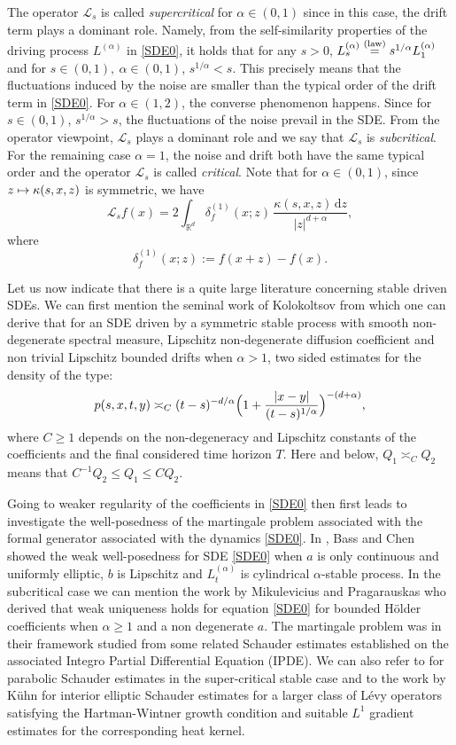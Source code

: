 \documentclass[JEP,XML,SOM,Unicode,published]{cedram}
\def\mto{\mathchoice{\longmapsto}{\mapsto}{\mapsto}{\mapsto}}
\theoremstyle{plain}
\theoremstyle{definition}
\newcommand\cL{{\mathcal L}}
\newcommand\mR{\mathbb{R}}
\newcommand\1{{\mathbf{1}}}
\newcommand\sL{{\mathscr L}}
\newcommand{\dif}{\,\mathrm{d}}
\begin{document}
The operator $\sL_{s}$ is called \textit{supercritical} for $\alpha\in(0,1)$ since in this case, the drift term plays a dominant role. Namely, from the self-similarity properties of the driving process $L^{(\alpha)}$ in \eqref{SDE0}, it holds that for any $s>0$, $L_s^{(\alpha)} \overset{({\rm law})}{=} s^{1/\alpha}L_1^{(\alpha)} $ and for $s\in (0,1),\ \alpha\in (0,1)$, $s^{1/\alpha}< s $. This precisely means that the fluctuations induced by the noise are smaller than the typical order of the drift term in \eqref{SDE0}.
For $\alpha\in(1,2)$, the converse phenomenon happens. Since for $s\in (0,1) $, $s^{1/\alpha}>s $, the fluctuations of the noise prevail in the SDE. From the operator viewpoint, $\cL_{s}$ plays a dominant role and we say that $\sL_{s}$ is \textit{subcritical}. For the remaining case $\alpha=1$, the noise and drift both have the same typical order and the operator $\sL_{s}$ is called \textit{critical}.
Note that for $\alpha\in(0,1)$, since $z\mto\kappa(s,x,z)$ is symmetric, we have
\[
\cL_{s} f(x)=2\int_{\mR^d}\delta^{(1)}_f(x;z)\,\frac{\kappa(s,x,z)\dif z}{|z|^{d+\alpha}},
\]
where
\[
\delta^{(1)}_f(x;z):=f(x+z)-f(x).
\]

Let us now indicate that there is a quite large literature concerning stable driven SDEs. We can first mention the seminal work of Kolokoltsov \cite{kolo:00} {from which one can derive} that for an SDE driven by a symmetric stable process with smooth non-degenerate spectral measure, Lipschitz non-degenerate diffusion coefficient and non trivial Lipschitz bounded drifts when $\alpha>1 $, two sided estimates for the density of the type:
\begin{equation}\label{FIRST_TW}
p(s,x,t,y)\asymp_C (t-s)^{-d/\alpha} \Bigl(1+\frac{|x-y|}{(t-s)^{1/\alpha}}\Bigr)^{-(d+\alpha)},
\end{equation}
where $C\ge 1$ depends on the non-degeneracy and Lipschitz constants of the coefficients and the final considered time horizon $T$.
Here and below, $Q_1\asymp_C Q_2$ means that $C^{-1}Q_2\leq Q_1\leq C Q_2$.

Going to weaker regularity of the coefficients in \eqref{SDE0} then first leads to investigate the well-posedness of the martingale problem associated with the formal generator associated with the dynamics \eqref{SDE0}. In \cite{Ba-Ch},
Bass and Chen showed the weak well-posedness for SDE \eqref{SDE0} when $a$ is only continuous and uniformly elliptic,
$b$ is Lipschitz and $L^{(\alpha)}_t$ is cylindrical $\alpha$-stable process.
In the subcritical case we can mention the work by Mikulevicius and Pragarauskas \cite{miku:prag:14}
who derived that weak uniqueness holds for equation \eqref{SDE0} for bounded Hölder coefficients when $ \alpha\ge 1$
and a non degenerate $a$. The martingale problem was in their framework studied from some related Schauder estimates established on the associated Integro Partial Differential Equation (IPDE). We can also refer to \cite{chau:meno:prio:20} for {parabolic} Schauder estimates in the super-critical {stable} case and {to the work by Kühn \cite{kuhn:20} for interior elliptic Schauder estimates for a larger class of Lévy operators satisfying the Hartman-Wintner growth condition and suitable $L^1$ gradient estimates for the corresponding heat kernel}.
\end{document}
